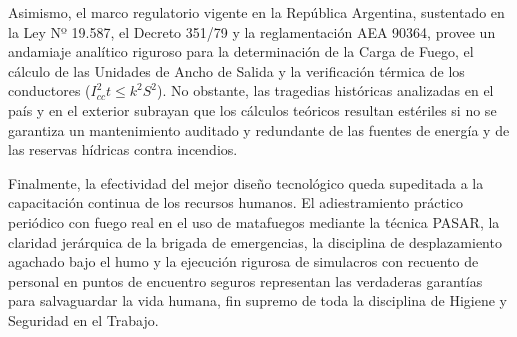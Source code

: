 Asimismo, el marco regulatorio vigente en la República Argentina, sustentado en la Ley Nº 19.587, el Decreto 351/79 y la
reglamentación AEA 90364, provee un andamiaje analítico riguroso para la determinación de la Carga de Fuego, el cálculo de
las Unidades de Ancho de Salida y la verificación térmica de los conductores ($I_{cc}^2 t \le k^2 S^2$). No obstante, las
tragedias históricas analizadas en el país y en el exterior subrayan que los cálculos teóricos resultan estériles si no se
garantiza un mantenimiento auditado y redundante de las fuentes de energía y de las reservas hídricas contra incendios.

Finalmente, la efectividad del mejor diseño tecnológico queda supeditada a la capacitación continua de los recursos
humanos. El adiestramiento práctico periódico con fuego real en el uso de matafuegos mediante la técnica PASAR, la
claridad jerárquica de la brigada de emergencias, la disciplina de desplazamiento agachado bajo el humo y la ejecución
rigurosa de simulacros con recuento de personal en puntos de encuentro seguros representan las verdaderas garantías para
salvaguardar la vida humana, fin supremo de toda la disciplina de Higiene y Seguridad en el Trabajo.
